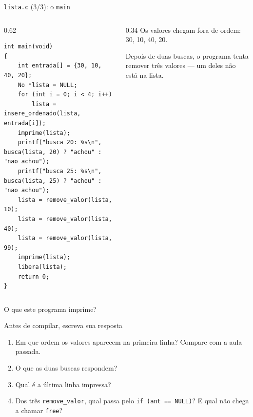 \documentclass[aspectratio=169]{beamer}
\begin{document}
\begin{frame}[fragile]{\texttt{lista.c} (3/3): o \texttt{main}}
  \vspace{-0.5em}
  \begin{columns}[c]
    \begin{column}{0.62\textwidth}
\begin{lstlisting}[style=codC]
int main(void)
{
    int entrada[] = {30, 10, 40, 20};
    No *lista = NULL;
    for (int i = 0; i < 4; i++)
        lista = insere_ordenado(lista, entrada[i]);
    imprime(lista);
    printf("busca 20: %s\n", busca(lista, 20) ? "achou" : "nao achou");
    printf("busca 25: %s\n", busca(lista, 25) ? "achou" : "nao achou");
    lista = remove_valor(lista, 10);
    lista = remove_valor(lista, 40);
    lista = remove_valor(lista, 99);
    imprime(lista);
    libera(lista);
    return 0;
}
\end{lstlisting}
    \end{column}
    \begin{column}{0.34\textwidth}
      \small
      Os valores chegam fora de ordem: 30, 10, 40, 20.

      \medskip
      Depois de duas buscas, o programa tenta remover três valores --- um
      deles não está na lista.
    \end{column}
  \end{columns}
\end{frame}

\begin{frame}{O que este programa imprime?}
  \begin{block}{Antes de compilar, escreva sua resposta}
    \begin{enumerate}
      \item Em que ordem os valores aparecem na primeira linha? Compare com a
        aula passada.
      \item O que as duas buscas respondem?
      \item Qual é a última linha impressa?
      \item Dos três \texttt{remove\_valor}, qual passa pelo
        \texttt{if (ant == NULL)}? E qual não chega a chamar
        \texttt{free}?
    \end{enumerate}
  \end{block}
\end{frame}
\end{document}
